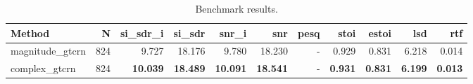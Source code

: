 \begin{table}[t]
\centering
\caption{Benchmark results.}
\label{tab:bench}
\begin{tabular}{lrrrrrrrrrr}
\toprule
Method & N & si\_sdr\_i & si\_sdr & snr\_i & snr & pesq & stoi & estoi & lsd & rtf \\
\midrule
magnitude_gtcrn & 824 & 9.727 & 18.176 & 9.780 & 18.230 & - & 0.929 & 0.831 & 6.218 & 0.014 \\
complex_gtcrn & 824 & \textbf{10.039} & \textbf{18.489} & \textbf{10.091} & \textbf{18.541} & - & \textbf{0.931} & \textbf{0.831} & \textbf{6.199} & \textbf{0.013} \\
\bottomrule
\end{tabular}
\end{table}